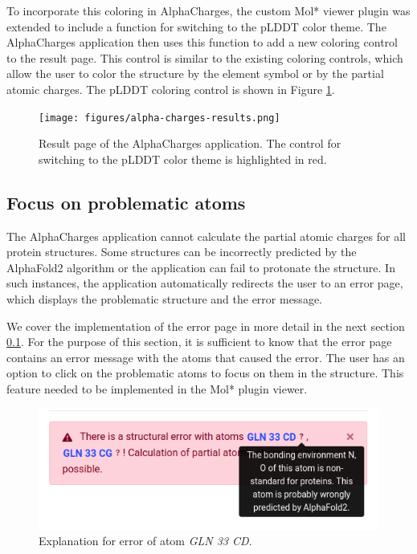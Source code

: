 \documentclass[
  digital,     %
  oneside,     %
  nosansbold,  %
  nocolorbold, %
  lof,         %
  lot,         %
]{fithesis4}
\begin{document}
To incorporate this coloring in AlphaCharges, the custom Mol* viewer plugin was extended to include a function for switching to the pLDDT color theme. The AlphaCharges application then uses this function to add a new coloring control to the result page. This control is similar to the existing coloring controls, which allow the user to color the structure by the element symbol or by the partial atomic charges. The pLDDT coloring control is shown in Figure \ref{fig:alpha-charges-results}.

\begin{figure}[htbp]
  \begin{center}
    \texttt{[image: figures/alpha-charges-results.png]}
  \end{center}
  \caption{Result page of the AlphaCharges application. The control for switching to the pLDDT color theme is highlighted in red.}
  \label{fig:alpha-charges-results}
\end{figure}

\subsection{Focus on problematic atoms}

The AlphaCharges application cannot calculate the partial atomic charges for all protein structures. Some structures can be incorrectly predicted by the AlphaFold2 algorithm or the application can fail to protonate the structure.
\cite{jumper2021alphafold} In such instances, the application automatically redirects the user to an error page, which displays the problematic structure and the error message.

We cover the implementation of the error page in more detail in the next section \ref{}. For the purpose of this section, it is sufficient to know that the error page contains an error message with the atoms that caused the error. The user has an option to click on the problematic atoms to focus on them in the structure. This feature needed to be implemented in the Mol* plugin viewer.


\begin{figure}[htbp]
  \begin{center}
    \includegraphics[width=\textwidth]{figures/wrong_structure_text.png}
  \end{center}
  \caption{Explanation for error of atom \textit{GLN 33 CD}.}
  \label{fig:wrong_structure_text}
\end{figure}
\end{document}
